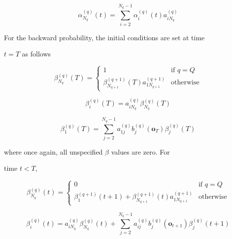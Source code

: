 \[


   \alpha^{(q)}_{N_q}(t) = 


        \sum_{i=2}^{N_q-1} \alpha^{(q)}_{i}(t) a^{(q)}_{iN_q}


\]


For the backward probability, the initial conditions are set at time


$t=T$ as follows


\[


   \beta^{(q)}_{N_q}(T) = 


        \left\{ \begin{array}{cl}


                              1 & \mbox{if $q=Q$} \\


                   \beta^{(q+1)}_{N_{q+1}}(T) a^{(q+1)}_{1N_{q+1}} & \mbox{otherwise}


                \end{array}


        \right.


\]


\[


   \beta^{(q)}_i(T) = a^{(q)}_{iN_q} \beta^{(q)}_{N_q}(T)


\]


\[


   \beta^{(q)}_1(T) = \sum^{N_q - 1}_{j=2} 


                  a^{(q)}_{1j} b^{(q)}_j(\bm{o}_T) \beta^{(q)}_j(T)


\]


where once again, all unspecified $\beta$ values are zero.  For


time $t<T$,


\[


   \beta^{(q)}_{N_q}(t) = 


        \left\{ \begin{array}{cl}


                              0 & \mbox{if $q=Q$} \\


                   \beta^{(q+1)}_1(t+1)+ \beta^{(q+1)}_{N_{q+1}} (t) 


                               a^{(q+1)}_{1N_{q+1}} & \mbox{otherwise}


                \end{array}


        \right.


\]


\[


    \beta^{(q)}_i(t) = 


                a^{(q)}_{iN_q} \beta^{(q)}_{N_q}(t) +


               \sum_{j=2}^{N_q-1} a^{(q)}_{ij} 


                      b^{(q)}_j(\bm{o}_{t+1}) \beta^{(q)}_{j}(t+1) 


\]


